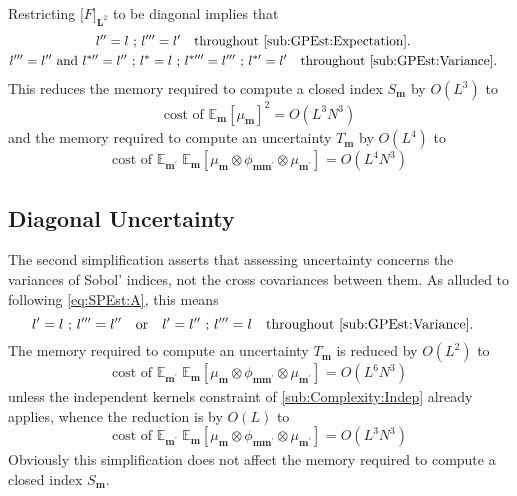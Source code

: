 \documentclass[preprint,12pt]{elsarticle}
\newcommand*{\M}[1]{\ensuremath{#1}\xspace}
\newcommand*{\mi}[1]{\mathbf{#1}}
\newcommand*{\te}[2][]{\left\lbrack{#2}\right\rbrack_{#1}}
\newcommand*{\tte}[2][]{\lbrack{#2}\rbrack_{#1}}
\newcommand{\T}[1]{\text{#1}}
\newcommand*{\QT}[2][]{\M{\quad\T{#2}\ifthenelse{\equal{#1}{}}{\quad}{#1}}}
\newcommand*{\evt}[3][]{\mathbb{E}_{#3}^{#1}\!#2}
\begin{document}
    Restricting $\tte[\mi{L}^{2}]{F}$ to be diagonal implies that
    \begin{gather*}
        l^{\prime\prime} = l \T{ ; } l^{\prime\prime\prime} = l^{\prime} \QT{throughout \cref{sub:GPEst:Expectation}.}  \\ 
        l^{\prime\prime\prime} = l^{\prime\prime} \T{ and } l^{*\prime\prime} = l^{\prime\prime} \T{ ; } l^{*} = l \T{ ; } l^{*\prime\prime\prime} = l^{\prime\prime\prime} \T{ ; } l^{*\prime} = l^{\prime} \QT{throughout \cref{sub:GPEst:Variance}.}
    \end{gather*}
    This reduces the memory required to compute a closed index $S_{\mi{m}}$ by $O(L^3)$ to
    \begin{equation*}
        \T{cost of }\evt{\te[]{\mu_{\mi{m}}}^{2}}{\mi{m}} = O(L^{3}N^{3})
    \end{equation*}
    and the memory required to compute an uncertainty $T_{\mi{m}}$ by $O(L^4)$ to
    \begin{equation*}
        \T{cost of }\evt{\;\evt{\te[]{\mu_{\mi{m}} \otimes \phi_{\mi{mm^{\prime}}} \otimes \mu_{\mi{m^{\prime}}}}}}{\mi{m^{\prime}}}{\mi{m}} = O(L^{4}N^{3})
    \end{equation*}

    \subsection{Diagonal Uncertainty}\label{sub:Complexity:Diag}
    The second simplification asserts that assessing uncertainty concerns the variances of Sobol' indices, not the cross covariances between them. As alluded to following \cref{eq:SPEst:A}, this means
    \begin{equation*}
        l^{\prime} = l \T{ ; } l^{\prime\prime\prime} = l^{\prime\prime} \QT{or} 
        l^{\prime} = l^{\prime\prime} \T{ ; } l^{\prime\prime\prime} = l \QT{throughout \cref{sub:GPEst:Variance}.}   
    \end{equation*}
    The memory required to compute an uncertainty $T_{\mi{m}}$ is reduced by $O(L^2)$ to
    \begin{equation*}
        \T{cost of }\evt{\;\evt{\te[]{\mu_{\mi{m}} \otimes \phi_{\mi{mm^{\prime}}} \otimes \mu_{\mi{m^{\prime}}}}}}{\mi{m^{\prime}}}{\mi{m}} = O(L^{6}N^{3})
    \end{equation*}
    unless the independent kernels constraint of \cref{sub:Complexity:Indep} already applies, whence the reduction is by $O(L)$ to
    \begin{equation*}
        \T{cost of }\evt{\;\evt{\te[]{\mu_{\mi{m}} \otimes \phi_{\mi{mm^{\prime}}} \otimes \mu_{\mi{m^{\prime}}}}}}{\mi{m^{\prime}}}{\mi{m}} = O(L^{3}N^{3})
    \end{equation*}
    Obviously this simplification does not affect the memory required to compute a closed index $S_{\mi{m}}$.
\end{document}
